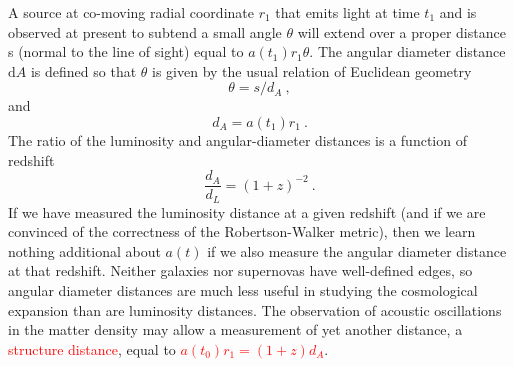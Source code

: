 \documentclass[12pt,a4paper]{article}
\newcommand{\dif}{\mathrm{d}}
\begin{document}
\cite{2008cosm.book.....W} A source at co-moving radial coordinate $r_1$ that emits light at time $t_1$ and is observed at present to subtend a small angle $\theta$ will extend over a proper distance s (normal to the line of sight) equal to $a(t_1)r_1 \theta$. The angular diameter distance $\dif A$ is defined so that $\theta$ is given by the usual relation of Euclidean geometry
\begin{equation}
\theta = s/d_A ~,
\end{equation}
and
\begin{equation}
d_A = a(t_1) r_1 ~.
\end{equation}
The ratio of the luminosity and angular-diameter distances is a function of redshift
\begin{equation}
\dfrac{d_A}{d_L} = (1+z)^{-2} ~.
\end{equation}
If we have measured the luminosity distance at a given redshift (and if we are convinced of the correctness of the Robertson-Walker metric), then we learn nothing additional about $a(t)$ if we also measure the angular diameter distance at that redshift. Neither galaxies nor supernovas have well-defined edges, so angular diameter distances are much less useful in studying the cosmological expansion than are luminosity distances. The observation of acoustic oscillations in the matter density may allow a measurement of yet another distance, a \textcolor{red}{structure distance}, equal to \textcolor{red}{$a(t_0)r_1 = (1+z)d_A$}.
\end{document}
